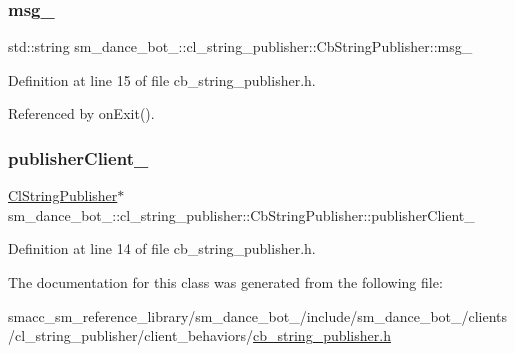 \subsubsection{\texorpdfstring{msg\+\_\+}{msg\_}}
{\footnotesize\ttfamily std\+::string sm\+\_\+dance\+\_\+bot\+\_\+::cl\+\_\+string\+\_\+publisher\+::\+Cb\+String\+Publisher\+::msg\+\_\+}



Definition at line 15 of file cb\+\_\+string\+\_\+publisher.\+h.



Referenced by on\+Exit().

\mbox{\label{classsm__dance__bot__2_1_1cl__string__publisher_1_1CbStringPublisher_a374db0f8b7ae20321f38c611108cb49a}} 
\subsubsection{\texorpdfstring{publisher\+Client\+\_\+}{publisherClient\_}}
{\footnotesize\ttfamily \hyperlink{classsm__dance__bot__2_1_1cl__string__publisher_1_1ClStringPublisher}{Cl\+String\+Publisher}$\ast$ sm\+\_\+dance\+\_\+bot\+\_\+::cl\+\_\+string\+\_\+publisher\+::\+Cb\+String\+Publisher\+::publisher\+Client\+\_\+}



Definition at line 14 of file cb\+\_\+string\+\_\+publisher.\+h.



The documentation for this class was generated from the following file\+:\begin{DoxyCompactItemize}
\item 
smacc\+\_\+sm\+\_\+reference\+\_\+library/sm\+\_\+dance\+\_\+bot\+\_/include/sm\+\_\+dance\+\_\+bot\+\_/clients/cl\+\_\+string\+\_\+publisher/client\+\_\+behaviors/\hyperlink{2_2include_2sm__dance__bot__2_2clients_2cl__string__publisher_2client__behaviors_2cb__string__publisher_8h}{cb\+\_\+string\+\_\+publisher.\+h}\end{DoxyCompactItemize}
